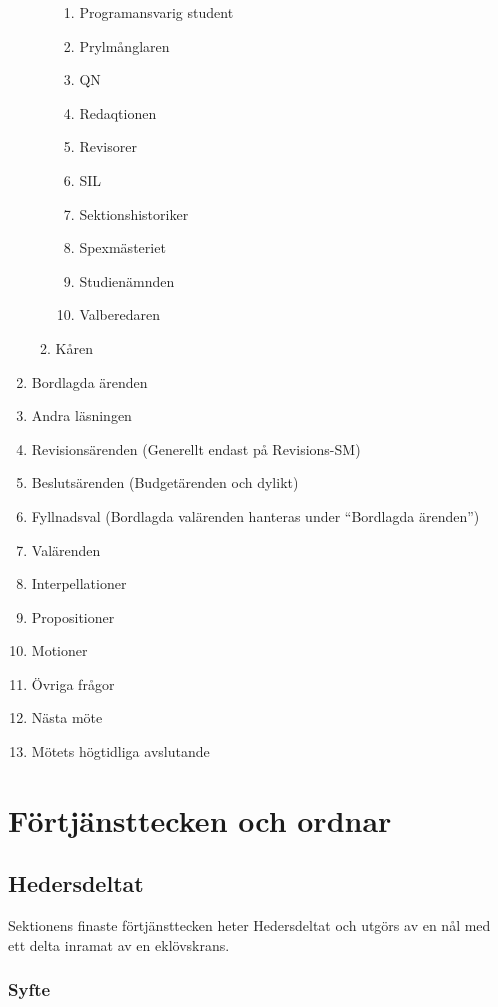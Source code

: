 \documentclass{dgovdoc}
\begin{document}
\begin{enumerate}
\begin{enumerate}
\begin{enumerate}
          \item Programansvarig student
          \item Prylmånglaren
          \item QN
          \item Redaqtionen
          \item Revisorer
          \item SIL
          \item Sektionshistoriker
          \item Spexmästeriet
          \item Studienämnden
          \item Valberedaren
      \end{enumerate}
      \item Kåren
  \end{enumerate}
  \item Bordlagda ärenden
  \item Andra läsningen
  \item Revisionsärenden (Generellt endast på Revisions-SM)
  \item Beslutsärenden (Budgetärenden och dylikt)
  \item Fyllnadsval (Bordlagda valärenden hanteras under ``Bordlagda ärenden'')
  \item Valärenden
  \item Interpellationer
  \item Propositioner
  \item Motioner
  \item Övriga frågor
  \item Nästa möte
  \item Mötets högtidliga avslutande
\end{enumerate}

\section{Förtjänsttecken och ordnar}

\subsection{Hedersdeltat}

Sektionens finaste förtjänsttecken heter Hedersdeltat och utgörs av en nål med
ett delta inramat av en eklövskrans.

\subsubsection{Syfte}
\end{document}
